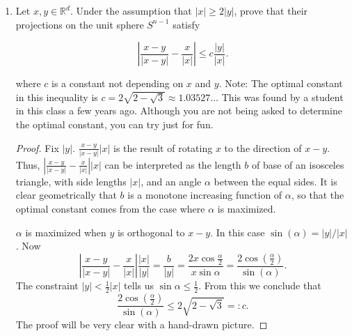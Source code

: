 \begin{enumerate}
\begin{proof}
	When $0 > x - a  > x - b$, we use symmetry of the function: $H f(x) = - \frac{1}{\pi} \int_{-(x - a)}^{(-(x - b)} \frac{1}{y} = \frac{1}{\pi} \log \frac{-(x - b)}{-(x - a)}  = \frac{1}{\pi} \log \frac{|x - a|}{ | x - b|}$.

	When $x - a > 0 > x - b$, we assume with out loss of generality that $|x - a| \ge  |x - b|$. We use symmetry to conclude that the integral on $[-|x - b|, |x - b|]$ is zero. Then the integral equals to
	$H f(x) = \frac{1}{\pi} \int _{|x - b|} ^{x  - a} \frac{1}{y} d y = \frac{1}{\pi} \log \frac{|x - a|}{|x - b|}$.

	To conclude $Hf \not\in L^\infty $, take $b > a > 0$ and $x = (1 - \varepsilon)b$. Then
	\[
		\pi Hf(x) = \log \frac{(1 - \varepsilon) b - a}{-\varepsilon b} = - \log \varepsilon + \log \frac{a - b + \varepsilon}{ b}
	.\] 
	As $\varepsilon \to 0$ above, this diverges.

	To conclude $H f \not\in  L^1$, take $b > a > 0$ and use mean value theorem write
	\[
		\pi H f(x) = \log \left( x - a \right)  - \log \left( x - b \right) = (b - a) \frac{1}{x_0} 
	.\] 
	Thus for $x > b$,
	\[
		\pi |H f(x)| \ge (b - a) \frac{1}{x - a}
	.\] 
	This does not integrate on $(b, +\infty )$.
	\end{proof}


\item Let $x, y \in \mathbb{R}^d$. Under the assumption that $|x| \geq 2|y|$, prove that their projections on the unit sphere $S^{n-1}$ satisfy

\[
\left|\frac{x-y}{|x-y|}-\frac{x}{|x|}\right| \leq c \frac{|y|}{|x|} .
\]

where $c$ is a constant not depending on $x$ and $y$.
Note: The optimal constant in this inequality is $c=2 \sqrt{2-\sqrt{3}} \approx 1.03527 \ldots$ This was found by a student in this class a few years ago. Although you are not being asked to determine the optimal constant, you can try just for fun.

\begin{proof}
	Fix $|y|$. $\frac{x-y}{|x-y|}|x|$ is the result of rotating  $x$ to the direction of $x - y$. Thus, $\left|\frac{x-y}{|x-y|}-\frac{x}{|x|}\right| |x|$ can be interpreted as the length $b$ of base of an isosceles triangle, with side lengths $|x|$, and an angle $\alpha$ between the equal sides. It is clear geometrically that $b$ is a monotone increasing function of $\alpha$, so that the optimal constant comes from the case where $\alpha$ is maximized.

	$\alpha$ is maximized when $y$ is orthogonal to $x - y$. In this case $\sin \left( \alpha \right)  = |y| / |x|$. Now
	\[
\left|\frac{x-y}{|x-y|}-\frac{x}{|x|}\right| \frac{|x|}{|y|}
= \frac{b}{|y|} = \frac{2 x \cos \frac{\alpha}{2}}{ x \sin \alpha} = \frac{2 \cos \left( \frac{\alpha}{2} \right) }{\sin \left( \alpha \right) }
	.\] 
	The constraint $|y| < \frac{1}{2}|x|$ tells us $\sin \alpha \le \frac{1}{2}$. From this we conclude that
	\[
		\frac{2 \cos \left( \frac{\alpha}{2} \right) }{\sin \left( \alpha \right) } \le 2 \sqrt{2 - \sqrt{3} }  =: c
	.\] 
	The proof will be very clear with a hand-drawn picture.
\end{proof}


\end{enumerate}
